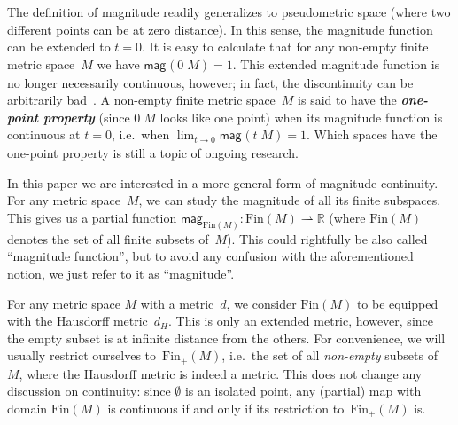 \documentclass[11pt]{article}
\theoremstyle{plain}
\newtheorem{definition}[theorem]{Definition}
\theoremstyle{definition}
\newcommand{\df}[1]{\emph{\textbf{#1}}}  %
\newcommand{\RR}{\mathbb{R}}
\newcommand{\parto}{\mathrel{\rightharpoonup}}  %
\newcommand{\mg}[1][]{\mathsf{mag}_{#1}}
\newcommand{\fsub}{\mathrm{Fin}}
\newcommand{\ifsub}{\fsub_{+}}
\begin{document}
The definition of magnitude readily generalizes to pseudometric space (where two different points can be at zero distance). In this sense, the magnitude function can be extended to $t = 0$. It is easy to calculate that for any non-empty finite metric space~$M$ we have $\mg(0\;\!M) = 1$. This extended magnitude function is no longer necessarily continuous, however; in fact, the discontinuity can be arbitrarily bad~\cite[Theorem~3.8]{Roff25}. A non-empty finite metric space~$M$ is said to have the \df{one-point property} (since $0\;\!M$ looks like one point) when its magnitude function is continuous at $t = 0$, i.e.~when $\lim_{t \to 0} \mg(t\;\!M) = 1$. Which spaces have the one-point property is still a topic of ongoing research.

In this paper we are interested in a more general form of magnitude continuity. For any metric space~$M$, we can study the magnitude of all its finite subspaces. This gives us a partial function $\mg[\fsub(M) ]\colon \fsub(M) \parto \RR$ (where $\fsub(M)$ denotes the set of all finite subsets of~$M$). This could rightfully be also called ``magnitude function'', but to avoid any confusion with the aforementioned notion, we just refer to it as ``magnitude''. 


For any metric space $M$ with a metric~$d$, we consider $\fsub(M)$ to be equipped with the Hausdorff metric~$d_H$. This is only an extended metric, however, since the empty subset is at infinite distance from the others. For convenience, we will usually restrict ourselves to~$\ifsub(M)$, i.e.\ the set of all \emph{non-empty} subsets of~$M$, where the Hausdorff metric is indeed a metric. This does not change any discussion on continuity: since $\emptyset$ is an isolated point, any (partial) map with domain $\fsub(M)$ is continuous if and only if its restriction to~$\ifsub(M)$ is.

\end{document}

